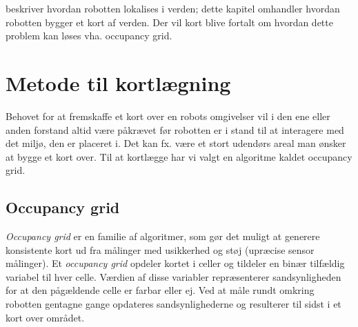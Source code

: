  beskriver hvordan robotten lokalises i verden; dette kapitel omhandler hvordan robotten bygger et kort af verden.
Der vil kort blive fortalt om hvordan dette problem kan løses vha. occupancy grid.

\section{Metode til kortlægning}
Behovet for at fremskaffe et kort over en robots omgivelser vil i den ene eller anden forstand altid være påkrævet før robotten er i stand til at interagere med det miljø, den er placeret i.
Det kan fx. være et stort udendørs areal man ønsker at bygge et kort over.
Til at kortlægge har vi valgt en algoritme kaldet occupancy grid. 

\subsection{Occupancy grid}
\textit{Occupancy grid} er en familie af algoritmer, som gør det muligt at generere konsistente kort ud fra målinger med usikkerhed og støj (upræcise sensor målinger).
Et \textit{occupancy grid} opdeler kortet i celler og tildeler en binær tilfældig variabel til hver celle.
Værdien af disse variabler repræsenterer sandsynligheden for at den pågældende celle er farbar eller ej.
Ved at måle rundt omkring robotten gentagne gange opdateres sandsynlighederne og resulterer til sidst i et kort over området.